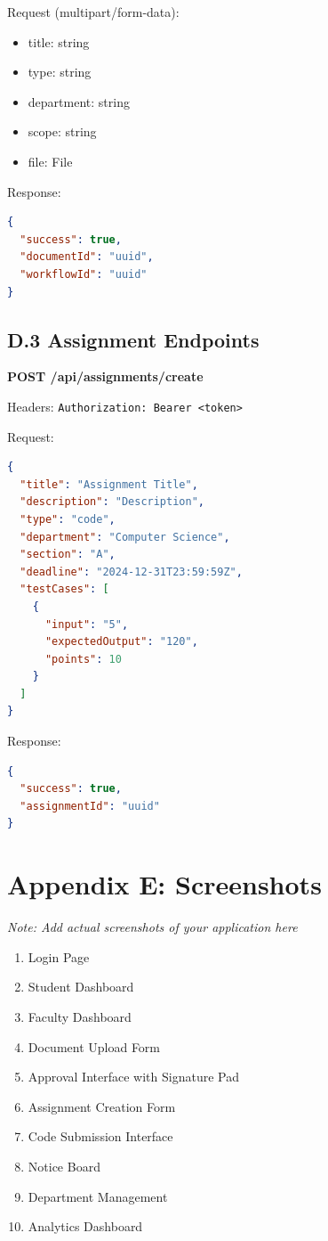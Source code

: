 Request (multipart/form-data):
\begin{itemize}
\item title: string
\item type: string
\item department: string
\item scope: string
\item file: File
\end{itemize}

Response:
\begin{lstlisting}[language=JSON]
{
  "success": true,
  "documentId": "uuid",
  "workflowId": "uuid"
}
\end{lstlisting}

\subsection{D.3 Assignment Endpoints}

\textbf{POST /api/assignments/create}

Headers: \texttt{Authorization: Bearer <token>}

Request:
\begin{lstlisting}[language=JSON]
{
  "title": "Assignment Title",
  "description": "Description",
  "type": "code",
  "department": "Computer Science",
  "section": "A",
  "deadline": "2024-12-31T23:59:59Z",
  "testCases": [
    {
      "input": "5",
      "expectedOutput": "120",
      "points": 10
    }
  ]
}
\end{lstlisting}

Response:
\begin{lstlisting}[language=JSON]
{
  "success": true,
  "assignmentId": "uuid"
}
\end{lstlisting}

\section{Appendix E: Screenshots}

\textit{Note: Add actual screenshots of your application here}

\begin{enumerate}
\item Login Page
\item Student Dashboard
\item Faculty Dashboard
\item Document Upload Form
\item Approval Interface with Signature Pad
\item Assignment Creation Form
\item Code Submission Interface
\item Notice Board
\item Department Management
\item Analytics Dashboard
\end{enumerate}

